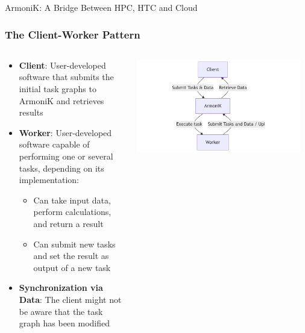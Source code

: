 \documentclass[10pt,aspectratio=1609]{beamer}
\begin{document}
\begin{section}{ArmoniK: A Bridge Between HPC, HTC and Cloud}
  \begin{frame}
    \frametitle{The Client-Worker Pattern}
    \begin{columns}[T]
      \begin{column}{0.5\textwidth}
        \begin{itemize}
          \item \textbf{Client}: User-developed software that submits the initial task graphs to ArmoniK and retrieves results
          \item \textbf{Worker}: User-developed software capable of performing one or several tasks, depending on its implementation:
          \begin{itemize}
            \item Can take input data, perform calculations, and return a result
            \item Can submit new tasks and set the result as output of a new task
          \end{itemize}
          \item \textbf{Synchronization via Data}: The client might not be aware that the task graph has been modified
        \end{itemize}
      \end{column}
      \begin{column}{0.5\textwidth}
        \centering
        \includegraphics[width=0.95\textwidth]{mermaid-client-worker.png}
      \end{column}
    \end{columns}
  \end{frame}


\end{section}
\end{document}
